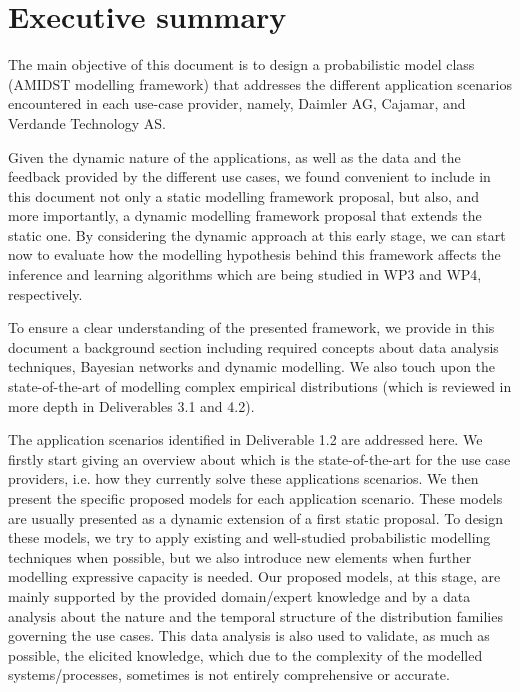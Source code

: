 \section{Executive summary}\label{section:executiveSummary}

The main objective of this document is to design a probabilistic model class (AMIDST modelling framework) that addresses the different application scenarios encountered in each use-case provider, namely, Daimler AG, Cajamar, and Verdande Technology AS.

Given the dynamic nature of the applications, as well as the data and the feedback provided by the different use cases, we found convenient to include in this document not only a static modelling framework proposal, but also, and more importantly, a dynamic modelling framework proposal that extends the static one. By considering the dynamic approach at this early stage, we can start now to evaluate how the modelling hypothesis behind this framework affects the inference and learning algorithms which are being studied in WP3 and WP4, respectively. 

To ensure a clear understanding of the presented framework, we provide in this document a background section including required concepts about data analysis techniques, Bayesian networks and dynamic modelling. We also touch upon the state-of-the-art of modelling complex empirical distributions (which is reviewed in more depth in Deliverables 3.1 and 4.2).

The application scenarios identified in Deliverable 1.2 are addressed here. We firstly start giving an overview about which is the state-of-the-art for the use case providers, i.e. how they currently solve these applications scenarios. We then present the specific proposed models for each application scenario. These models are usually presented as a dynamic extension of a first static proposal. To design these models, we try to apply existing and well-studied probabilistic modelling techniques when possible, but we also introduce new elements when further modelling expressive capacity is needed. Our proposed models, at this stage, are mainly supported by the provided domain/expert knowledge and by a data analysis about the nature and the temporal structure of the distribution families governing the use cases. This data analysis is also used to validate, as much as possible, the elicited knowledge, which due to the complexity of the modelled systems/processes, sometimes is not entirely comprehensive or accurate.

